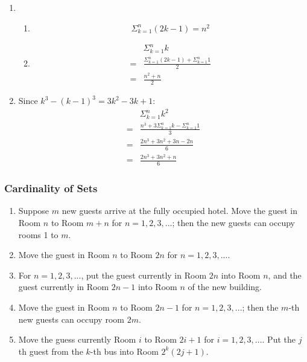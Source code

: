 \documentclass{../../cls/sig-alternate-05-2015}
\begin{document}
\begin{enumerate}
\item 
\begin{enumerate}
    \item 
    \begin{equation}
        \Sigma^n_{k = 1}(2k - 1) = n^2
    \end{equation}
    
    \item 
    \begin{align}
        & \Sigma^n_{k = 1} k\\
        = & \frac{\Sigma^n_{k = 1}(2k - 1) + \Sigma^n_{k = 1} 1}{2}\\
        = & \frac{n^2 + n}{2}
    \end{align}
\end{enumerate}

\item Since $k^3 - (k - 1)^3 = 3k^2 - 3k + 1$:
\begin{align}
    & \Sigma_{k = 1}^n k^2\\
    = & \frac{n^3 + 3\Sigma_{k = 1}^n k - \Sigma_{k = 1}^n 1}{3}\\
    = & \frac{2n^3 + 3n^2 + 3n - 2n}{6}\\
    = & \frac{2n^3 + 3n^2 + n}{6}
\end{align}
\end{enumerate}
\subsubsection{Cardinality of Sets}
\begin{enumerate}
\item Suppose $m$
new guests arrive at the fully occupied hotel. Move the guest
in Room $n$ to Room $m + n$ for $n = 1, 2, 3, ...$; then the new
guests can occupy rooms 1 to $m$.
\item Move the guest
in Room $n$ to Room $2n$ for $n = 1, 2, 3, ...$.
\item For $n = 1, 2, 3, ...$, put the guest currently in Room $2n$ into Room $n$, and the guest
currently in Room $2n - 1$ into Room $n$ of the new building.
\item Move the guest
in Room $n$ to Room $2n - 1$ for $n = 1, 2, 3, ...$; then the $m$-th new guests can occupy room $2m$.
\item Move the guess currently Room $i$ to Room $2i + 1$ for $i = 1, 2, 3, ...$. Put the $j$ th guest from the $k$-th bus into
Room $2^k(2j + 1)$.
\end{enumerate}
\end{document}
